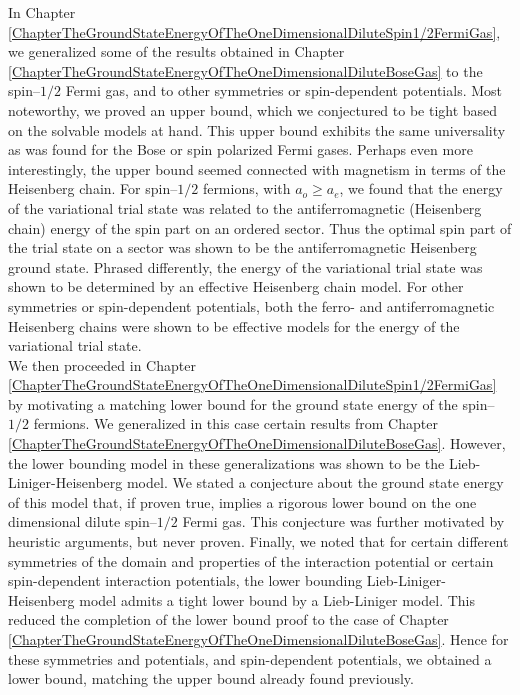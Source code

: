 In Chapter \ref{ChapterTheGroundStateEnergyOfTheOneDimensionalDiluteSpin1/2FermiGas}, we generalized some of the results obtained in Chapter \ref{ChapterTheGroundStateEnergyOfTheOneDimensionalDiluteBoseGas} to the spin--$ 1/2 $ Fermi gas, and to other symmetries or spin-dependent potentials. Most noteworthy, we proved an upper bound, which we conjectured to be tight based on the solvable models at hand. This upper bound exhibits the same universality as was found for the Bose or spin polarized Fermi gases. Perhaps even more interestingly, the upper bound seemed connected with magnetism in terms of the Heisenberg chain. For spin--$ 1/2 $ fermions, with $ a_o\geq a_e $, we found that the energy of the variational trial state was related to the antiferromagnetic (Heisenberg chain) energy of the spin part on an ordered sector. Thus the optimal spin part of the trial state on a sector was shown to be the antiferromagnetic Heisenberg ground state. Phrased differently, the energy of the variational trial state was shown to be determined by an effective Heisenberg chain model. For other symmetries or spin-dependent potentials, both the ferro- and antiferromagnetic Heisenberg chains were shown to be effective models for the energy of the variational trial state.\\
We then proceeded in Chapter \ref{ChapterTheGroundStateEnergyOfTheOneDimensionalDiluteSpin1/2FermiGas} by motivating a matching lower bound for the ground state energy of the spin--$ 1/2 $ fermions. We generalized in this case certain results from Chapter \ref{ChapterTheGroundStateEnergyOfTheOneDimensionalDiluteBoseGas}. However, the lower bounding model in these generalizations was shown to be the Lieb-Liniger-Heisenberg model. We stated a conjecture about the ground state energy of this model that, if proven true, implies a rigorous lower bound on the one dimensional dilute spin--$ 1/2 $ Fermi gas. This conjecture was further motivated by heuristic arguments, but never proven. Finally, we noted that for certain different symmetries of the domain and properties of the interaction potential or certain spin-dependent interaction potentials, the lower bounding Lieb-Liniger-Heisenberg model admits a tight lower bound by a Lieb-Liniger model. This reduced the completion of the lower bound proof to the case of Chapter \ref{ChapterTheGroundStateEnergyOfTheOneDimensionalDiluteBoseGas}. Hence for these symmetries and potentials, and spin-dependent potentials, we obtained a lower bound, matching the upper bound already found previously.


